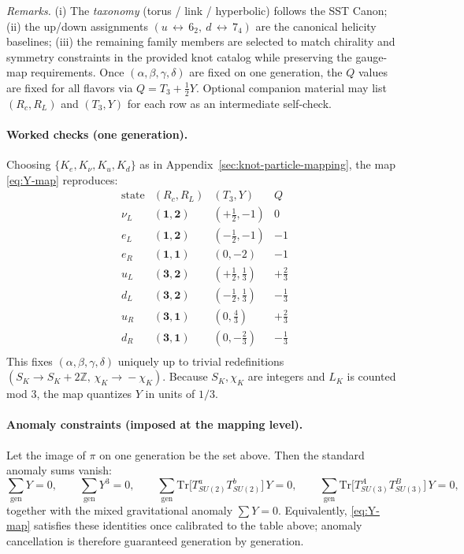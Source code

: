 \documentclass[11pt, preprint,titlepage]{revtex4-2}
\begin{document}
\noindent\textit{Remarks.} (i) The \emph{taxonomy} (torus / link / hyperbolic) follows the SST Canon; (ii) the up/down assignments $(u\,\leftrightarrow\,6_2,\ d\,\leftrightarrow\,7_4)$ are the canonical helicity baselines; (iii) the remaining family members are selected to match chirality and symmetry constraints in the provided knot catalog while preserving the gauge-map requirements. Once $(\alpha,\beta,\gamma,\delta)$ are fixed on one generation, the $Q$ values are fixed for all flavors via $Q=T_3+\tfrac12Y$. Optional companion material may list $(R_c,R_L)$ and $(T_3,Y)$ for each row as an intermediate self-check.


\paragraph{Worked checks (one generation).}
	Choosing \(\{K_e,K_\nu,K_u,K_d\}\) as in Appendix~\ref{sec:knot-particle-mapping}, the map \eqref{eq:Y-map} reproduces:
	\[
		\begin{array}{c|c|c|c}
			\text{state} & (R_c,R_L) & (T_3,Y) & Q \\
			\hline
			\nu_L & (\mathbf{1},\mathbf{2}) & (+\tfrac{1}{2},-1) & 0 \\
			e_L  & (\mathbf{1},\mathbf{2}) & (-\tfrac{1}{2},-1) & -1 \\
			e_R  & (\mathbf{1},\mathbf{1}) & (0,-2) & -1 \\
			u_L  & (\mathbf{3},\mathbf{2}) & (+\tfrac{1}{2},\tfrac{1}{3}) & +\tfrac{2}{3} \\
			d_L  & (\mathbf{3},\mathbf{2}) & (-\tfrac{1}{2},\tfrac{1}{3}) & -\tfrac{1}{3} \\
			u_R  & (\mathbf{3},\mathbf{1}) & (0,\tfrac{4}{3}) & +\tfrac{2}{3} \\
			d_R  & (\mathbf{3},\mathbf{1}) & (0,-\tfrac{2}{3}) & -\tfrac{1}{3} \\
		\end{array}
	\]
	This fixes \((\alpha,\beta,\gamma,\delta)\) uniquely up to trivial redefinitions \((S_K\!\to\!S_K+2\mathbb{Z},\,\chi_K\!\to\!-\chi_K)\).
	Because \(S_K,\chi_K\) are integers and \(L_K\) is counted mod \(3\), the map quantizes \(Y\) in units of \(1/3\).

	\paragraph{Anomaly constraints (imposed at the mapping level).}
	Let the image of \(\pi\) on one generation be the set above.
	Then the standard anomaly sums vanish:
	\[
		\sum_{\text{gen}} Y = 0,\qquad
		\sum_{\text{gen}} Y^3 = 0,\qquad
		\sum_{\text{gen}} \mathrm{Tr}\big[T^a_{SU(2)}T^b_{SU(2)}\big]\,Y=0,\qquad
		\sum_{\text{gen}} \mathrm{Tr}\big[T^A_{SU(3)}T^B_{SU(3)}\big]\,Y=0,
	\]
	together with the mixed gravitational anomaly \(\sum Y=0\).
	Equivalently, \eqref{eq:Y-map} satisfies these identities once calibrated to the table above; anomaly cancellation is therefore guaranteed generation by generation.
\end{document}
